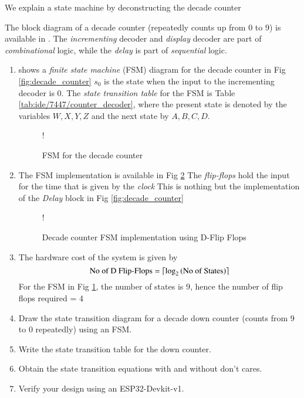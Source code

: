 We explain  a state machine by deconstructing the decade counter

The block diagram of a decade counter (repeatedly counts up from 0 to 9)
is available in .  The {\em incrementing } decoder
and {\em display} decoder are part of {\em combinational} logic, while
the {\em delay} is part of {\em sequential} logic.
%
%
\begin{enumerate}[label=\arabic*.,ref=\theenumi]
%
\item {} shows a {\em finite state machine} (FSM) diagram for the decade counter in Fig \ref{fig:decade_counter}  $s_0$ is the state when the input to the incrementing decoder is 0.  The {\em state transition table} for the FSM is Table \ref{tab:ide/7447/counter_decoder},
		where the present state is denoted by the variables $W,X,Y,Z$ and the next state by $A,B,C,D$.  
\begin{figure}[H]
\centering
\resizebox {\columnwidth} {!} {

}
\caption{FSM for the decade counter}
\label{fig:fsm_counter}
\end{figure}
\item The FSM implementation is available in Fig \ref{fig:dff}  The {\em flip-flops} hold the input for the time that is given by the {\em clock}  This is nothing but the implementation of the {\em Delay} block in Fig \ref{fig:decade_counter}
%
\begin{figure}[H]
\resizebox {\columnwidth} {!} {

}
\caption{Decade counter FSM implementation using D-Flip Flops}
\label{fig:dff}
\end{figure}
%
\item The hardware cost of the system is given by
\begin{equation}
\text{No of D Flip-Flops} = \left \lceil \log_{2}\left(\text{No of States}\right) \right \rceil
\end{equation}
For the FSM in Fig \ref{fig:fsm_counter}, the number of states is 9, hence the number of flip flops required = 4  
\item Draw the state transition diagram for 
a decade down counter (counts from 9 to 0 repeatedly) using an FSM.  
\item Write the state transition table for the down counter.
\item Obtain the state transition equations with and without don't cares.
\item Verify your design using an ESP32-Devkit-v1.
\end{enumerate}


